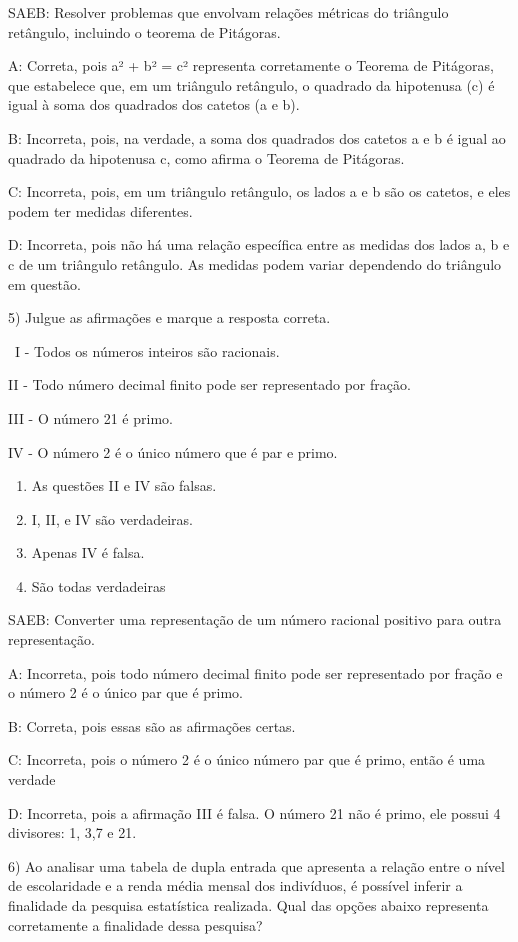 SAEB: Resolver problemas que envolvam relações métricas do triângulo
retângulo, incluindo o teorema de Pitágoras.

A: Correta, pois a² + b² = c² representa corretamente o Teorema de
Pitágoras, que estabelece que, em um triângulo retângulo, o quadrado da
hipotenusa (c) é igual à soma dos quadrados dos catetos (a e b).

B: Incorreta, pois, na verdade, a soma dos quadrados dos catetos a e b é
igual ao quadrado da hipotenusa c, como afirma o Teorema de Pitágoras.

C: Incorreta, pois, em um triângulo retângulo, os lados a e b são os
catetos, e eles podem ter medidas diferentes.

D: Incorreta, pois não há uma relação específica entre as medidas dos
lados a, b e c de um triângulo retângulo. As medidas podem variar
dependendo do triângulo em questão.

5) Julgue as afirmações e marque a resposta correta.

~I - Todos os números inteiros são racionais.

II - Todo número decimal finito pode ser representado por fração.

III - O número 21 é primo.

IV - O número 2 é o único número que é par e primo.

\begin{enumerate}
\def\labelenumi{\alph{enumi})}
\item
  As questões II e IV são falsas.
\item
  I, II, e IV são verdadeiras.
\item
  Apenas IV é falsa.
\item
  São todas verdadeiras
\end{enumerate}

SAEB: Converter uma representação de um número racional positivo para
outra representação.

A: Incorreta, pois todo número decimal finito pode ser representado por
fração e o número 2 é o único par que é primo.

B: Correta, pois essas são as afirmações certas.

C: Incorreta, pois o número 2 é o único número par que é primo, então é
uma verdade

D: Incorreta, pois a afirmação III é falsa. O número 21 não é primo, ele
possui 4 divisores: 1, 3,7 e 21.

6) Ao analisar uma tabela de dupla entrada que apresenta a relação entre
o nível de escolaridade e a renda média mensal dos indivíduos, é
possível inferir a finalidade da pesquisa estatística realizada. Qual
das opções abaixo representa corretamente a finalidade dessa pesquisa?


